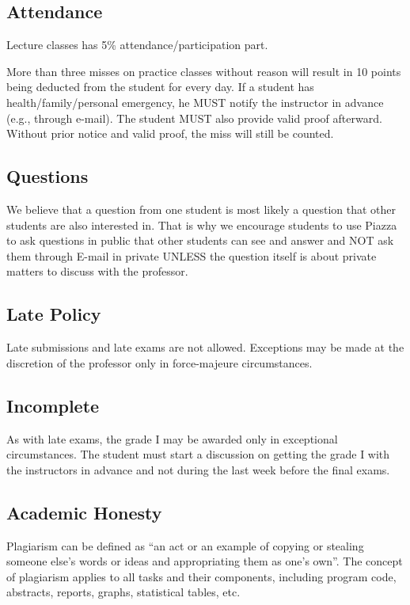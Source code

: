 \documentclass[12pt,a4paper,oneside]{article}
\begin{document}
    \subsection{Attendance}
    
        Lecture classes has 5\% attendance/participation part.
        
        More than three misses on practice classes without reason will result in 10 points being deducted from the student for every day. If a student has health/family/personal emergency, he MUST notify the instructor in advance (e.g., through e-mail). The student MUST also provide valid proof afterward. Without prior notice and valid proof, the miss will still be counted.
        
    \subsection{Questions}
    
        We believe that a question from one student is most likely a question that other students are also interested in. That is why we encourage students to use Piazza to ask questions in public that other students can see and answer and NOT ask them through E-mail in private UNLESS the question itself is about private matters to discuss with the professor.

    \subsection{Late Policy}

        Late submissions and late exams are not allowed. Exceptions may be made at the discretion of the professor only in force-majeure circumstances.

    \subsection{Incomplete}
    
        As with late exams, the grade I may be awarded only in exceptional circumstances. The student must start a discussion on getting the grade I with the instructors in advance and not during the last week before the final exams.
        
    \subsection{Academic Honesty}
    
        Plagiarism can be defined as “an act or an example of copying or stealing someone else’s words or ideas and appropriating them as one’s own”. The concept of plagiarism applies to all tasks and their components, including program code, abstracts, reports, graphs, statistical tables, etc.
\end{document}
